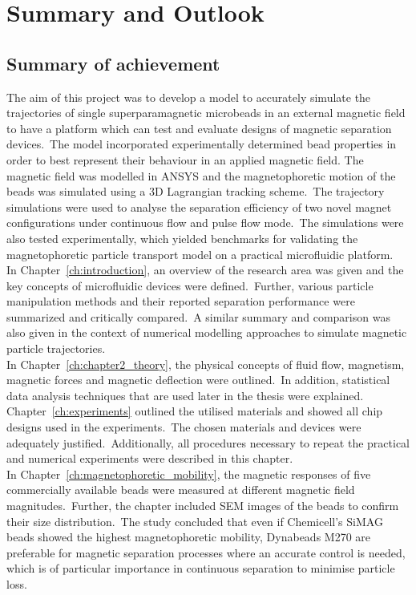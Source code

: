 \chapter{Summary and Outlook}\label{ch:summaryAndOutlook}
\section{Summary of achievement}\label{s:SummaryAndContributions}
The aim of this project was to develop a model to accurately simulate the trajectories of single superparamagnetic microbeads in an external magnetic field to have a platform which can test and evaluate designs of magnetic separation devices.\ The model incorporated experimentally determined bead properties in order to best represent their behaviour in an applied magnetic field. The magnetic field was modelled in ANSYS and the magnetophoretic motion of the beads was simulated using a 3D Lagrangian tracking scheme.\ The trajectory simulations were used to analyse the separation efficiency of two novel magnet configurations under continuous flow and pulse flow mode.\ The simulations were also tested experimentally, which yielded benchmarks for validating the magnetophoretic particle transport model on a practical microfluidic platform.\\
In Chapter~\ref{ch:introduction}, an overview of the research area was given and the key concepts of microfluidic devices were defined.\ Further, various particle manipulation methods and their reported separation performance were summarized and critically compared.\ A similar summary and comparison was also given in the context of numerical modelling approaches to simulate magnetic particle trajectories.\\
In Chapter~\ref{ch:chapter2_theory}, the physical concepts of fluid flow, magnetism, magnetic forces and magnetic deflection were outlined.\ In addition, statistical data analysis techniques that are used later in the thesis were explained.\\
Chapter~\ref{ch:experiments} outlined the utilised materials and showed all chip designs used in the experiments.\ The chosen materials and devices were adequately justified.\ Additionally, all procedures necessary to repeat the practical and numerical experiments were described in this chapter.\\
In Chapter~\ref{ch:magnetophoretic_mobility}, the magnetic responses of five commercially available beads were measured at different magnetic field magnitudes.\ Further, the chapter included SEM images of the beads to confirm their size distribution.\ The study concluded that even if Chemicell's SiMAG beads showed the highest magnetophoretic mobility, Dynabeads M270 are preferable for magnetic separation processes where an accurate control is needed, which is of particular importance in continuous separation to minimise particle loss.\\
